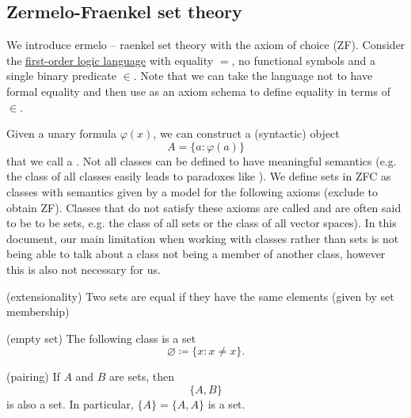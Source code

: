 \subsection{Zermelo-Fraenkel set theory}\label{subsec:zermelo_fraenkel_set_theory}

\begin{definition}\label{def:inductive_set}
\end{definition}

\begin{definition}\label{def:zfc}
  We introduce ermelo – raenkel set theory with the axiom of choice (ZF). Consider the \hyperref[def:first_order_language]{first-order logic language} with equality \( = \), no functional symbols and a single binary predicate \( \in \). Note that we can take the language not to have formal equality and then use  as an axiom schema to define equality in terms of \( \in \).

  Given a unary formula \( \varphi(x) \), we can construct a (syntactic) object
  \begin{equation*}
    A = \{ a \colon \varphi(a) \}
  \end{equation*}
  that we call a . Not all classes can be defined to have meaningful semantics (e.g. the class of all classes easily leads to paradoxes like ). We define sets in ZFC as classes with semantics given by a model for the following axioms (exclude  to obtain ZF). Classes that do not satisfy these axioms are called  and are often said to be  to be sets, e.g. the class of all sets or the class of all vector spaces). In this document, our main limitation when working with classes rather than sets is not being able to talk about a class not being a member of another class, however this is also not necessary for us.

  \begin{thmenum}
    (extensionality) Two sets are equal if they have the same elements (given by set membership)

    (empty set) The following class is a set
    \begin{equation*}
      \varnothing \coloneqq \{ x \colon x \neq x \}.
    \end{equation*}

    (pairing) If \( A \) and \( B \) are sets, then
    \begin{equation*}
      \{ A, B \}
    \end{equation*}
    is also a set. In particular, \( \{ A \} = \{ A, A \} \) is a set.


\end{thmenum}
\end{definition}
